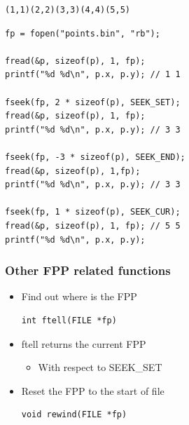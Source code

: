 \documentclass{../c-lecture}
\begin{document}
\begin{frame}[fragile]
  \begin{verbatim}
(1,1)(2,2)(3,3)(4,4)(5,5)
  \end{verbatim}
  \begin{verbatim}
fp = fopen("points.bin", "rb");

fread(&p, sizeof(p), 1, fp);
printf("%d %d\n", p.x, p.y); // 1 1

fseek(fp, 2 * sizeof(p), SEEK_SET);
fread(&p, sizeof(p), 1, fp);
printf("%d %d\n", p.x, p.y); // 3 3

fseek(fp, -3 * sizeof(p), SEEK_END);
fread(&p, sizeof(p), 1,fp);
printf("%d %d\n", p.x, p.y); // 3 3

fseek(fp, 1 * sizeof(p), SEEK_CUR);
fread(&p, sizeof(p), 1, fp); // 5 5
printf("%d %d\n", p.x, p.y);
  \end{verbatim}
\end{frame}

\begin{frame}[fragile]
  \frametitle{Other FPP related functions}
  \begin{itemize}
    \item Find out where is the FPP
    \begin{verbatim}
int ftell(FILE *fp)
    \end{verbatim}
    \item ftell returns the current FPP
    \begin{itemize}
      \item With respect to SEEK_SET
    \end{itemize}
    \item Reset the FPP to the start of file
    \begin{verbatim}
void rewind(FILE *fp)
    \end{verbatim}
  \end{itemize}
\end{frame}
\end{document}
